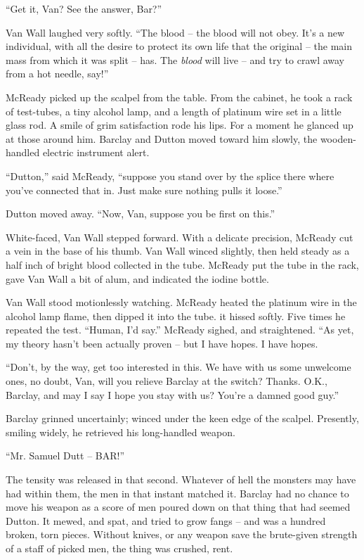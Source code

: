 \documentclass[letterpaper,openany,12pt]{memoir}		%
\begin{document}
``Get it, Van? See the answer, Bar?''

Van Wall laughed very softly. ``The blood -- the blood will not obey. It's a new
individual, with all the desire to protect its own life that the original -- the
main mass from which it was split -- has. The \emph{blood} will live -- and try
to crawl away from a hot needle, say!''

McReady picked up the scalpel from the table. From the cabinet, he took a rack
of test-tubes, a tiny alcohol lamp, and a length of platinum wire set in a
little glass rod. A smile of grim satisfaction rode his lips. For a moment he
glanced up at those around him. Barclay and Dutton moved toward him slowly, the
wooden-handled electric instrument alert.

``Dutton,'' said McReady, ``suppose you stand over by the splice there where
you've connected that in. Just make sure nothing pulls it loose.''

Dutton moved away. ``Now, Van, suppose you be first on this.''

White-faced, Van Wall stepped forward. With a delicate precision, McReady cut a
vein in the base of his thumb. Van Wall winced slightly, then held steady as a
half inch of bright blood collected in the tube. McReady put the tube in the
rack, gave Van Wall a bit of alum, and indicated the iodine bottle.

Van Wall stood motionlessly watching. McReady heated the platinum wire in the
alcohol lamp flame, then dipped it into the tube. it hissed softly. Five times
he repeated the test. ``Human, I'd say.'' McReady sighed, and straightened. ``As
yet, my theory hasn't been actually proven -- but I have hopes. I have hopes.

``Don't, by the way, get too interested in this. We have with us some unwelcome
ones, no doubt, Van, will you relieve Barclay at the switch? Thanks. O.K.,
Barclay, and may I say I hope you stay with us? You're a damned good guy.''

Barclay grinned uncertainly; winced under the keen edge of the scalpel.
Presently, smiling widely, he retrieved his long-handled weapon.

``Mr. Samuel Dutt -- BAR!''

The tensity was released in that second. Whatever of hell the monsters may have
had within them, the men in that instant matched it. Barclay had no chance to
move his weapon as a score of men poured down on that thing that had seemed
Dutton. It mewed, and spat, and tried to grow fangs -- and was a hundred broken,
torn pieces. Without knives, or any weapon save the brute-given strength of a
staff of picked men, the thing was crushed, rent.
\end{document}

